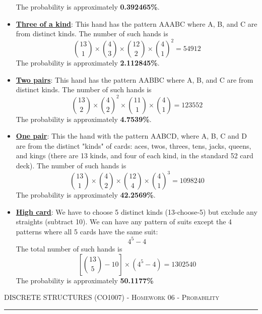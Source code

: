 \documentclass[12pt]{amsart}
\begin{document}
\begin{itemize}
The probability is approximately \textbf{0.392465\%}.
    \item \textbf{\underline{Three of a kind}}: This hand has the pattern AAABC where A, B, and C are from distinct kinds. The number of such hands is \[\binom{13}{1}\times\binom{4}{3}\times\binom{12}{2}\times\binom{4}{1}^2=54912\] The probability is approximately \textbf{2.112845\%}.
    \item \textbf{\underline{Two pairs}}: This hand has the pattern AABBC where A, B, and C are from distinct kinds. The number of such hands is \[\binom{13}{2}\times\binom{4}{2}^2\times\binom{11}{1}\times\binom{4}{1}=123 552\] The probability is approximately \textbf{4.7539\%}.
    \item \textbf{\underline{One pair}}: This the hand with the pattern AABCD, where A, B, C and D are from the distinct "kinds" of cards: aces, twos, threes, tens, jacks, queens, and kings (there are 13 kinds, and four of each kind, in the standard 52 card deck). The number of such hands is \[\binom{13}{1}\times\binom{4}{2}\times\binom{12}{4}\times\binom{4}{1}^3=1 098 240\] The probability is approximately  \textbf{42.2569\%}.
    \item \textbf{\underline{High card}}: We have to choose 5 distinct kinds (13-choose-5) but exclude any straights (subtract 10). We can have any pattern of suits except the 4 patterns where all 5 cards have the same suit:\[4^{5}-4\]The total number of such hands is \[\left[\binom{13}{5}-10\right]\times (4^{5}-4)=1302540\] The probability is approximately \textbf{50.1177\%}
    
\end{itemize}
\newpage
{\scshape } \hfill {\scshape DISCRETE STRUCTURES (CO1007) - Homework 06 - Probability} \hfill {\scshape }
 
\smallskip

\hrule

\bigskip
\end{document}
